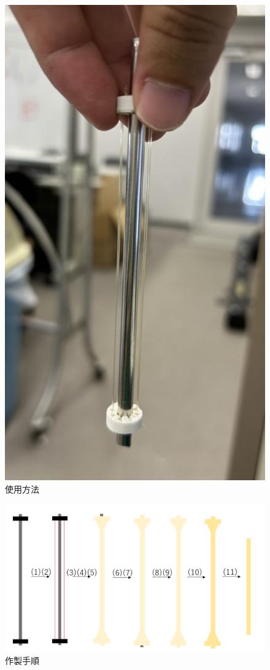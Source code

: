 \begin{figure}[htbp]
\begin{minipage}[b]{0.49\hsize}
    \includegraphics[scale=0.1]{pic/tukau.jpg}
    \caption{使用方法}
    \label{fig:14}
  \end{minipage}
  \end{figure}
  \begin{figure}[htbp]
  \centering  %
  \includegraphics[scale=0.3]{pic/14.PNG}
  \caption{作製手順}
  \label{fig:15}
\end{figure}
